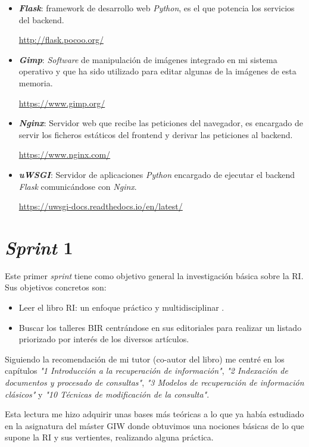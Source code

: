 \begin{itemize}
	\item \textbf{\textit{Flask}}: \Gls{framework} de desarrollo web \textit{Python}, es el que potencia los servicios del \gls{backend}.
	
	\url{http://flask.pocoo.org/}
	
	\item \textbf{\textit{Gimp}}: \textit{Software} de manipulación de imágenes integrado en mi sistema operativo y que ha sido utilizado para editar algunas de la imágenes de esta memoria.
	
	\url{https://www.gimp.org/}
	
	\item \textit{\textbf{Nginx}}: Servidor web que recibe las peticiones del navegador, es encargado de servir los ficheros estáticos del \gls{frontend} y derivar las peticiones al \gls{backend}.
	
	\url{https://www.nginx.com/}
	
	\item \textbf{\textit{uWSGI}}: Servidor de aplicaciones \textit{Python} encargado de ejecutar el \gls{backend} \textit{Flask} comunicándose con \textit{Nginx}.
	
	\url{https://uwsgi-docs.readthedocs.io/en/latest/}
\end{itemize}

\section{\textit{Sprint} 1}
Este primer \textit{sprint} tiene como objetivo general la investigación básica sobre la \acrshort{RI}. Sus objetivos concretos son: 

\begin{itemize}
	\item Leer el libro \acrlong{RI}: un enfoque práctico y multidisciplinar \cite{RIspaBook}.
	\item Buscar los talleres \acrshort{BIR} centrándose en sus editoriales para realizar un listado priorizado por interés de los diversos artículos.
\end{itemize}

Siguiendo la recomendación de mi tutor (co-autor del libro) me centré en los capítulos \textit{"1 Introducción a la recuperación de información"}, \textit{"2 Indexación de documentos y procesado de consultas"}, \textit{"3 Modelos de recuperación de información clásicos"} y \textit{"10 Técnicas de modificación de la consulta"}. 

Esta lectura me hizo adquirir unas bases más teóricas a lo que ya había estudiado en la asignatura del máster \acrlong{GIW} donde obtuvimos una nociones básicas de lo que supone la \acrshort{RI} y sus vertientes, realizando alguna práctica.

